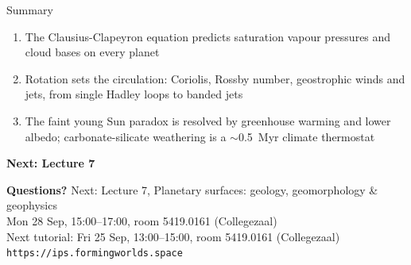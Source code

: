 \documentclass[aspectratio=169, 11pt]{beamer}
\begin{document}
\begin{frame}{Summary}
  \begin{enumerate}\setlength\itemsep{6pt}
    \item The Clausius-Clapeyron equation predicts saturation vapour pressures and cloud bases on every planet
    \item Rotation sets the circulation: Coriolis, Rossby number, geostrophic winds and jets, from single Hadley loops to banded jets
    \item The faint young Sun paradox is resolved by greenhouse warming and lower albedo; carbonate-silicate weathering is a $\sim$0.5~Myr climate thermostat
  \end{enumerate}
  \vskip6pt
  \textbf{Next: Lecture 7}
\end{frame}

\begin{frame}
  \vfill
  \begin{center}
    {\color{white}\Large\bfseries Questions?}
    \vskip20pt
    {\color{white!85}\large Next: Lecture 7, Planetary surfaces: geology, geomorphology \& geophysics}\\[4pt]
    {\color{white!85}\small Mon 28 Sep, 15:00--17:00, room 5419.0161 (Collegezaal)}\\[12pt]
    {\color{white!85}\small Next tutorial: Fri 25 Sep, 13:00--15:00, room 5419.0161 (Collegezaal)}\\[20pt]
    {\color{white!70}\small \texttt{https://ips.formingworlds.space}}
  \end{center}
  \vfill
\end{frame}
\end{document}
